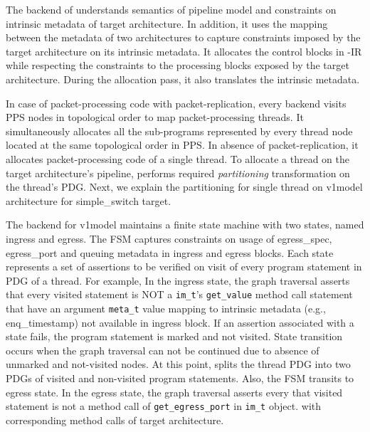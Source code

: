 \documentclass[letterpaper,twocolumn,10pt]{article}
\begin{document}
The backend of \ucomp understands semantics of pipeline model and 
constraints on intrinsic metadata of target architecture. In addition, 
it uses the mapping between the metadata of two architectures to 
capture constraints imposed by the target architecture on its 
intrinsic metadata. It allocates the control blocks in \uarch-IR 
while respecting the constraints to the processing blocks exposed by 
the target architecture. During the allocation pass, it also 
translates the intrinsic metadata.





In case of packet-processing code with packet-replication, every 
backend visits PPS nodes in topological order to map 
packet-processing threads. It simultaneously allocates all the 
sub-programs represented by every thread node located at the same 
topological order in PPS. In absence of packet-replication, it 
allocates packet-processing code of a single thread.
To allocate a thread on the target architecture's pipeline, \ucomp 
performs required \emph{partitioning} transformation on the 
thread's PDG. Next, we explain the partitioning for single 
thread on v1model architecture for simple\_switch target.


The backend for v1model maintains a finite state machine with two 
states, named ingress and egress. The FSM captures constraints on 
usage of egress\_spec, egress\_port and queuing metadata in ingress 
and egress blocks. Each state represents a set of assertions to be 
verified on visit of every program statement in PDG of a thread. 
For example, In the ingress state, the graph traversal asserts that 
every visited statement is NOT a \texttt{im\_t}'s \texttt{get\_value} 
method call statement that have an argument \texttt{meta\_t} value 
mapping to intrinsic metadata (e.g., enq\_timestamp) not available in 
ingress block.
If an assertion associated with a state fails, the program 
statement is marked and not visited.
State transition occurs when the graph traversal can not be continued 
due to absence of unmarked and not-visited nodes.
At this point, \ucomp splits the thread PDG into two PDGs of visited 
and non-visited program statements. Also, the FSM transits to 
egress state.
In the egress state, the graph traversal asserts every that visited 
statement is not a method call of \texttt{get\_egress\_port} in 
\texttt{im\_t} object.
with corresponding method calls of target architecture.
\end{document}
